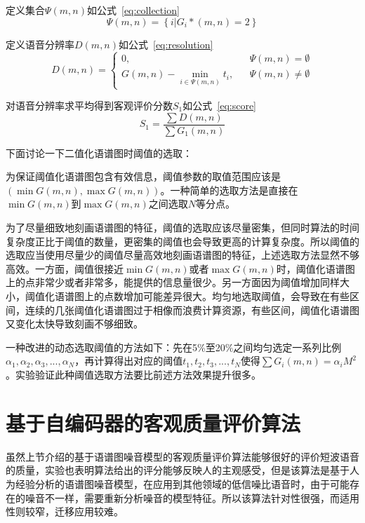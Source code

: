 定义集合$\Psi(m,n)$如公式~\ref{eq:collection}
\begin{equation}\label{eq:collection}
\Psi(m,n)=\left\{i|G_i*(m,n)=2\right\}
\end{equation}

定义语音分辨率$D(m,n)$如公式~\ref{eq:resolution}
\begin{equation}\label{eq:resolution}
D(m,n) =  \left\{
    \begin{array}{rcl}
    0, && {\Psi(m,n)=\emptyset} \\
    G(m,n) - \min\limits_{i\in\Psi(m,n)}t_i, && {\Psi(m,n)\neq\emptyset}
    \end{array} \right.
\end{equation}

对语音分辨率求平均得到客观评价分数$S_1$如公式~\ref{eq:score}
\begin{equation}\label{eq:score}
S_1 = \frac{\sum D(m,n)}{\sum G_1(m,n)}
\end{equation}

下面讨论一下二值化语谱图时阈值的选取：

为保证阈值化语谱图包含有效信息，阈值参数的取值范围应该是$\left(\min{G(m,n)}, \max{G(m,n)}\right)$。一种简单的选取方法是直接在$\min{G(m,n)}$到$\max{G(m,n)}$之间选取$N$等分点。

为了尽量细致地刻画语谱图的特征，阈值的选取应该尽量密集，但同时算法的时间复杂度正比于阈值的数量，更密集的阈值也会导致更高的计算复杂度。所以阈值的选取应当使用尽量少的阈值尽量高效地刻画语谱图的特征，上述选取方法显然不够高效。一方面，阈值很接近$\min{G(m,n)}$或者$\max{G(m,n)}$时，阈值化语谱图上的点非常少或者非常多，能提供的信息量很少。另一方面因为阈值增加同样大小，阈值化语谱图上的点数增加可能差异很大。均匀地选取阈值，会导致在有些区间，连续的几张阈值化语谱图过于相像而浪费计算资源，有些区间，阈值化语谱图又变化太快导致刻画不够细致。

一种改进的动态选取阈值的方法如下：先在5\%至20\%之间均匀选定一系列比例$\alpha_1,\alpha_2,\alpha_3,...,\alpha_N$，再计算得出对应的阈值$t_1,t_2,t_3,...,t_N$使得$\sum G_i(m,n)=\alpha_i M^2$。实验验证此种阈值选取方法要比前述方法效果提升很多。


\section{基于自编码器的客观质量评价算法}

虽然上节介绍的基于语谱图噪音模型的客观质量评价算法能够很好的评价短波语音的质量，实验也表明算法给出的评分能够反映人的主观感受，但是该算法是基于人为经验分析的语谱图噪音模型，在应用到其他领域的低信噪比语音时，由于可能存在的噪音不一样，需要重新分析噪音的模型特征。所以该算法针对性很强，而适用性则较窄，迁移应用较难。

